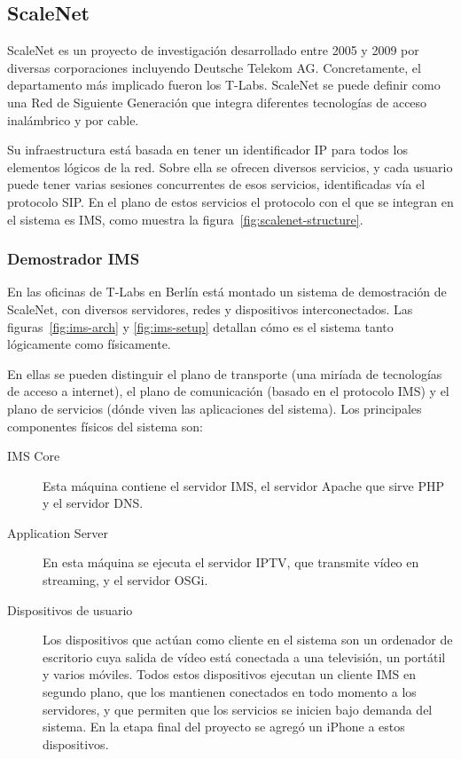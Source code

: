 \subsection{ScaleNet} %
\label{sub:scalenet}

ScaleNet es un proyecto de investigación desarrollado entre 2005 y 2009 por diversas corporaciones incluyendo Deutsche Telekom AG.
Concretamente, el departamento más implicado fueron los T-Labs.
ScaleNet se puede definir como una Red de Siguiente Generación que integra diferentes tecnologías de acceso inalámbrico y por cable.

Su infraestructura está basada en tener un identificador IP para todos los elementos lógicos de la red.
Sobre ella se ofrecen diversos servicios, y cada usuario puede tener varias sesiones concurrentes de esos servicios, identificadas vía el protocolo SIP.
En el plano de estos servicios el protocolo con el que se integran en el sistema es IMS, como muestra la figura~\ref{fig:scalenet-structure}.

\subsubsection{Demostrador IMS} %
\label{ssub:demostrador_ims}

En las oficinas de T-Labs en Berlín está montado un sistema de demostración de ScaleNet, con diversos servidores, redes y dispositivos interconectados.
Las figuras~\ref{fig:ims-arch} y \ref{fig:ims-setup} detallan cómo es el sistema tanto lógicamente como físicamente.

En ellas se pueden distinguir el plano de transporte (una miríada de tecnologías de acceso a internet), el plano de comunicación (basado en el protocolo IMS) y el plano de servicios (dónde viven las aplicaciones del sistema).
Los principales componentes físicos del sistema son:

\begin{description}
  \item[IMS Core] Esta máquina contiene el servidor IMS, el servidor Apache que sirve PHP y el servidor DNS.
  \item[Application Server] En esta máquina se ejecuta el servidor IPTV, que transmite vídeo en streaming, y el servidor OSGi.
  \item[Dispositivos de usuario] Los dispositivos que actúan como cliente en el sistema son un ordenador de escritorio cuya salida de vídeo está conectada a una televisión, un portátil y varios móviles.
  Todos estos dispositivos ejecutan un cliente IMS en segundo plano, que los mantienen conectados en todo momento a los servidores, y que permiten que los servicios se inicien bajo demanda del sistema.
  En la etapa final del proyecto se agregó un iPhone a estos dispositivos.
\end{description}


